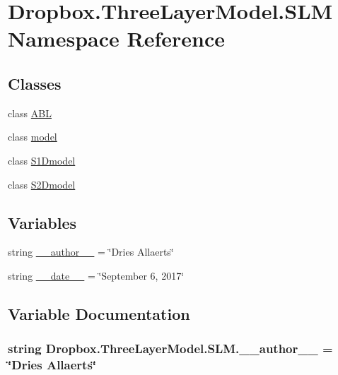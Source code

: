 \hypertarget{namespaceDropbox_1_1ThreeLayerModel_1_1SLM}{\section{Dropbox.\+Three\+Layer\+Model.\+S\+L\+M Namespace Reference}
\label{namespaceDropbox_1_1ThreeLayerModel_1_1SLM}
}
\subsection*{Classes}
\begin{DoxyCompactItemize}
\item 
class \hyperlink{classDropbox_1_1ThreeLayerModel_1_1SLM_1_1ABL}{A\+B\+L}
\item 
class \hyperlink{classDropbox_1_1ThreeLayerModel_1_1SLM_1_1model}{model}
\item 
class \hyperlink{classDropbox_1_1ThreeLayerModel_1_1SLM_1_1S1Dmodel}{S1\+Dmodel}
\item 
class \hyperlink{classDropbox_1_1ThreeLayerModel_1_1SLM_1_1S2Dmodel}{S2\+Dmodel}
\end{DoxyCompactItemize}
\subsection*{Variables}
\begin{DoxyCompactItemize}
\item 
string \hyperlink{namespaceDropbox_1_1ThreeLayerModel_1_1SLM_a2a553fd3611f22d97854d68a82975e1d}{\+\_\+\+\_\+author\+\_\+\+\_\+} = \char`\"{}Dries Allaerts\char`\"{}
\item 
string \hyperlink{namespaceDropbox_1_1ThreeLayerModel_1_1SLM_a265ec8e8243dbdb217159ead3dea2aba}{\+\_\+\+\_\+date\+\_\+\+\_\+} = \char`\"{}September 6, 2017\char`\"{}
\end{DoxyCompactItemize}


\subsection{Variable Documentation}
\hypertarget{namespaceDropbox_1_1ThreeLayerModel_1_1SLM_a2a553fd3611f22d97854d68a82975e1d}{
\subsubsection[{\+\_\+\+\_\+author\+\_\+\+\_\+}]{\setlength{\rightskip}{0pt plus 5cm}string Dropbox.\+Three\+Layer\+Model.\+S\+L\+M.\+\_\+\+\_\+author\+\_\+\+\_\+ = \char`\"{}Dries Allaerts\char`\"{}}}\label{namespaceDropbox_1_1ThreeLayerModel_1_1SLM_a2a553fd3611f22d97854d68a82975e1d}


